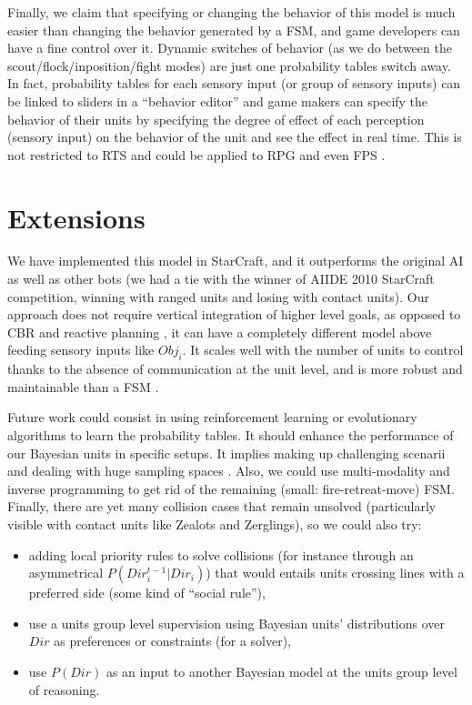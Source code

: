 Finally, we claim that specifying or changing the behavior of this model is much easier than changing the behavior generated by a FSM, and game developers can have a fine control over it. Dynamic switches of behavior (as we do between the scout/flock/inposition/fight modes) are just one probability tables switch away. In fact, probability tables for each sensory input (or group of sensory inputs) can be linked to sliders in a ``behavior editor'' and game makers can specify the behavior of their units by specifying the degree of effect of each perception (sensory input) on the behavior of the unit and see the effect in real time. This is not restricted to RTS and could be applied to RPG and even FPS .


\section{Extensions}

We have implemented this model in StarCraft, and it outperforms the original AI as well as other bots (we had a tie with the winner of AIIDE 2010 StarCraft competition, winning with ranged units and losing with contact units). Our approach does not require vertical integration of higher level goals, as opposed to CBR and reactive planning \citep{Ontanon2007,WeberCIG10}, it can have a completely different model above feeding sensory inputs like $Obj_i$. It scales well with the number of units to control thanks to the absence of communication at the unit level, and is more robust and maintainable than a FSM \citep{FSM}.

Future work could consist in using reinforcement learning \citep{Sutton} or evolutionary algorithms \citep{SmithCIG10} to learn the probability tables. It should enhance the performance of our Bayesian units in specific setups. It implies making up challenging scenarii and dealing with huge sampling spaces \citep{Asmuth09}. Also, we could use multi-modality \citep{Colas10} and inverse programming \citep{LeHy04} to get rid of the remaining (small: fire-retreat-move) FSM. Finally, there are yet many collision cases that remain unsolved (particularly visible with contact units like Zealots and Zerglings), so we could also try: 
\begin{itemize}
\item adding local priority rules to solve collisions (for instance through an asymmetrical $P(Dir_i^{t-1}|Dir_i)$) that would entails units crossing lines with a preferred side (some kind of ``social rule''),
\item use a units group level supervision using Bayesian units' distributions over $Dir$ as preferences or constraints (for a solver),
\item use $P(Dir)$ as an input to another Bayesian model at the units group level of reasoning.
\end{itemize}
